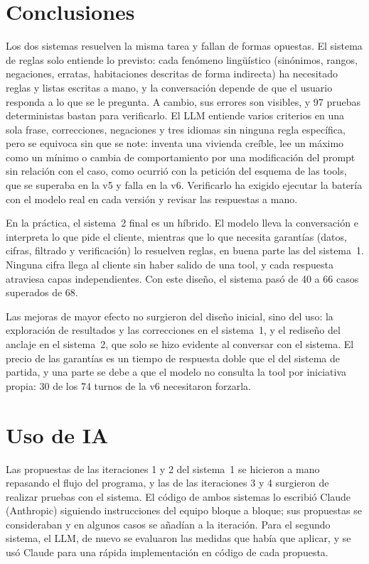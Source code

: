 \documentclass[10pt,a4paper]{article}
\begin{document}
\section{Conclusiones}

Los dos sistemas resuelven la misma tarea y fallan de formas opuestas. El sistema de reglas solo entiende lo previsto: cada fenómeno lingüístico (sinónimos, rangos, negaciones, erratas, habitaciones descritas de forma indirecta) ha necesitado reglas y listas escritas a mano, y la conversación depende de que el usuario responda a lo que se le pregunta. A cambio, sus errores son visibles, y 97 pruebas deterministas bastan para verificarlo. El LLM entiende varios criterios en una sola frase, correcciones, negaciones y tres idiomas sin ninguna regla específica, pero se equivoca sin que se note: inventa una vivienda creíble, lee un máximo como un mínimo o cambia de comportamiento por una modificación del prompt sin relación con el caso, como ocurrió con la petición del esquema de las tools, que se superaba en la v5 y falla en la v6. Verificarlo ha exigido ejecutar la batería con el modelo real en cada versión y revisar las respuestas a mano.

En la práctica, el sistema~2 final es un híbrido. El modelo lleva la conversación e interpreta lo que pide el cliente, mientras que lo que necesita garantías (datos, cifras, filtrado y verificación) lo resuelven reglas, en buena parte las del sistema~1. Ninguna cifra llega al cliente sin haber salido de una tool, y cada respuesta atraviesa capas independientes. Con este diseño, el sistema pasó de 40 a 66 casos superados de 68.

Las mejoras de mayor efecto no surgieron del diseño inicial, sino del uso: la exploración de resultados y las correcciones en el sistema~1, y el rediseño del anclaje en el sistema~2, que solo se hizo evidente al conversar con el sistema. El precio de las garantías es un tiempo de respuesta doble que el del sistema de partida, y una parte se debe a que el modelo no consulta la tool por iniciativa propia: 30 de los 74 turnos de la v6 necesitaron forzarla.

\section{Uso de IA}

Las propuestas de las iteraciones 1 y 2 del sistema~1 se hicieron a mano repasando el flujo del programa, y las de las iteraciones 3 y 4 surgieron de realizar pruebas con el sistema. El código de ambos sistemas lo escribió Claude (Anthropic) siguiendo instrucciones del equipo bloque a bloque; sus propuestas se consideraban y en algunos casos se añadían a la iteración. Para el segundo sistema, el LLM, de nuevo se evaluaron las medidas que había que aplicar, y se usó Claude para una rápida implementación en código de cada propuesta.
\end{document}
